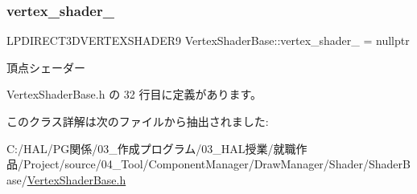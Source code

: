 \subsubsection{\texorpdfstring{vertex\+\_\+shader\+\_\+}{vertex\_shader\_}}
{\footnotesize\ttfamily L\+P\+D\+I\+R\+E\+C\+T3\+D\+V\+E\+R\+T\+E\+X\+S\+H\+A\+D\+E\+R9 Vertex\+Shader\+Base\+::vertex\+\_\+shader\+\_\+ = nullptr\hspace{0.3cm}{\ttfamily [private]}}



頂点シェーダー 



 Vertex\+Shader\+Base.\+h の 32 行目に定義があります。



このクラス詳解は次のファイルから抽出されました\+:\begin{DoxyCompactItemize}
\item 
C\+:/\+H\+A\+L/\+P\+G関係/03\+\_\+作成プログラム/03\+\_\+\+H\+A\+L授業/就職作品/\+Project/source/04\+\_\+\+Tool/\+Component\+Manager/\+Draw\+Manager/\+Shader/\+Shader\+Base/\mbox{\hyperlink{_vertex_shader_base_8h}{Vertex\+Shader\+Base.\+h}}\end{DoxyCompactItemize}
